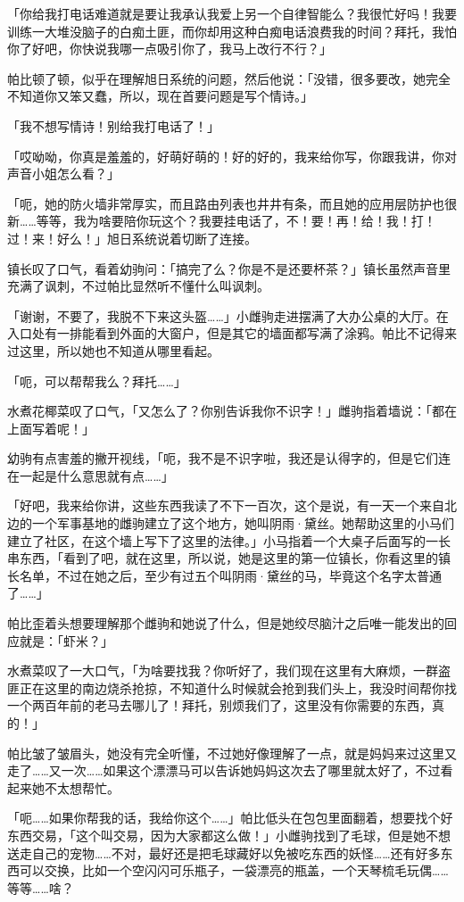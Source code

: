 「你给我打电话难道就是要让我承认我爱上另一个自律智能么？我很忙好吗！我要训练一大堆没脑子的白痴土匪，而你却用这种白痴电话浪费我的时间？拜托，我怕你了好吧，你快说我哪一点吸引你了，我马上改行不行？」

帕比顿了顿，似乎在理解旭日系统的问题，然后他说：「没错，很多要改，她完全不知道你又笨又蠢，所以，现在首要问题是写个情诗。」

「我不想写情诗！别给我打电话了！」

「哎呦呦，你真是羞羞的，好萌好萌的！好的好的，我来给你写，你跟我讲，你对声音小姐怎么看？」

「呃，她的防火墙非常厚实，而且路由列表也井井有条，而且她的应用层防护也很新……等等，我为啥要陪你玩这个？我要挂电话了，不！要！再！给！我！打！过！来！好么！」旭日系统说着切断了连接。

镇长叹了口气，看着幼驹问：「搞完了么？你是不是还要杯茶？」镇长虽然声音里充满了讽刺，不过帕比显然听不懂什么叫讽刺。

「谢谢，不要了，我脱不下来这头盔……」小雌驹走进摆满了大办公桌的大厅。在入口处有一排能看到外面的大窗户，但是其它的墙面都写满了涂鸦。帕比不记得来过这里，所以她也不知道从哪里看起。

「呃，可以帮帮我么？拜托……」

水煮花椰菜叹了口气，「又怎么了？你别告诉我你不识字！」雌驹指着墙说：「都在上面写着呢！」

幼驹有点害羞的撇开视线，「呃，我不是不识字啦，我还是认得字的，但是它们连在一起是什么意思就有点……」

「好吧，我来给你讲，这些东西我读了不下一百次，这个是说，有一天一个来自北边的一个军事基地的雌驹建立了这个地方，她叫阴雨·黛丝。她帮助这里的小马们建立了社区，在这个墙上写下了这里的法律。」小马指着一个大桌子后面写的一长串东西，「看到了吧，就在这里，所以说，她是这里的第一位镇长，你看这里的镇长名单，不过在她之后，至少有过五个叫阴雨·黛丝的马，毕竟这个名字太普通了……」

帕比歪着头想要理解那个雌驹和她说了什么，但是她绞尽脑汁之后唯一能发出的回应就是：「虾米？」

水煮菜叹了一大口气，「为啥要找我？你听好了，我们现在这里有大麻烦，一群盗匪正在这里的南边烧杀抢掠，不知道什么时候就会抢到我们头上，我没时间帮你找一个两百年前的老马去哪儿了！拜托，别烦我们了，这里没有你需要的东西，真的！」

帕比皱了皱眉头，她没有完全听懂，不过她好像理解了一点，就是妈妈来过这里又走了……又一次……如果这个漂漂马可以告诉她妈妈这次去了哪里就太好了，不过看起来她不太想帮忙。

「呃……如果你帮我的话，我给你这个……」帕比低头在包包里面翻着，想要找个好东西交易，「这个叫交易，因为大家都这么做！」小雌驹找到了毛球，但是她不想送走自己的宠物……不对，最好还是把毛球藏好以免被吃东西的妖怪……还有好多东西可以交换，比如一个空闪闪可乐瓶子，一袋漂亮的瓶盖，一个天琴梳毛玩偶……等等……啥？

